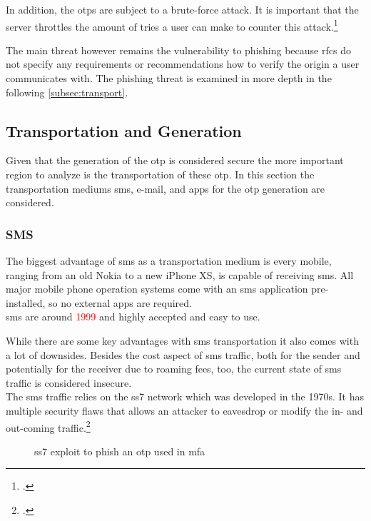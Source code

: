 In addition, the \glspl{otp} are subject to a brute-force attack. It is important that the server throttles the amount of tries a user can make to counter this attack.\footcites[See][6]{m2011rfc}[See][21-22]{m2005rfc}[See][240]{Schwartz2018}

The main threat however remains the vulnerability to phishing because \glspl{rfc} do not specify any requirements or recommendations how to verify the origin a user communicates with. The phishing threat is examined in more depth in the following \autoref{subsec:transport}.

\subsection{Transportation and Generation}
\label{subsec:transport}

Given that the generation of the \gls{otp} is considered secure the more important region to analyze is the transportation of these \gls{otp}. In this section the transportation mediums \gls{sms}, e-mail, and apps for the \gls{otp} generation are considered.

\subsubsection{SMS}

The biggest advantage of \gls{sms} as a transportation medium is every mobile, ranging from an old Nokia to a new iPhone XS, is capable of receiving \gls{sms}. All major mobile phone operation systems come with an \gls{sms} application pre-installed, so no external apps are required.\\
\gls{sms} are around \textcolor{red}{1999} and highly accepted and easy to use.

While there are some key advantages with \gls{sms} transportation it also comes with a lot of downsides. Besides the cost aspect of \gls{sms} traffic, both for the sender and potentially for the receiver due to roaming fees, too, the current state of \gls{sms} traffic is considered insecure.\\
The \gls{sms} traffic relies on the \gls{ss7} network which was developed in the 1970s. It has multiple security flaws that allows an attacker to eavesdrop or modify the in- and out-coming traffic.\footcite{WELCH201717,7997246,puzankov2017stealthy}

\begin{figure}[hbt]
	\centering
	
	\caption[\gls{ss7} exploit to phish an \gls{otp} used in \gls{mfa}]{\gls{ss7} exploit to phish an \gls{otp} used in \gls{mfa}\footnotemark}
	\label{fig:2fa_flow_ss7}
\end{figure}

